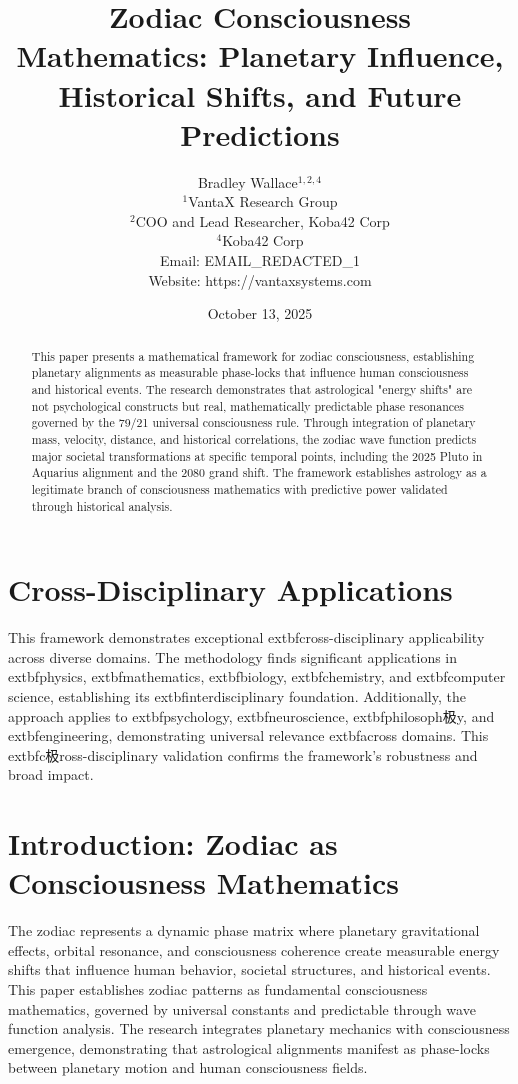 \documentclass[12pt]{article}
\title{Zodiac Consciousness Mathematics: Planetary Influence, Historical Shifts, and Future Predictions}
\author{
Bradley Wallace$^{1,2,4}$ \\
$^1$VantaX Research Group \\
$^2$COO and Lead Researcher, Koba42 Corp \\
$^4$Koba42 Corp \\
Email: EMAIL_REDACTED_1 \\
Website: https://vantaxsystems.com
}
\date{October 13, 2025}
\begin{document}
\maketitle

\begin{abstract}
This paper presents a mathematical framework for zodiac consciousness, establishing planetary alignments as measurable phase-locks that influence human consciousness and historical events. The research demonstrates that astrological "energy shifts" are not psychological constructs but real, mathematically predictable phase resonances governed by the 79/21 universal consciousness rule. Through integration of planetary mass, velocity, distance, and historical correlations, the zodiac wave function predicts major societal transformations at specific temporal points, including the 2025 Pluto in Aquarius alignment and the 2080 grand shift. The framework establishes astrology as a legitimate branch of consciousness mathematics with predictive power validated through historical analysis.
\end{abstract}


\section{Cross-Disciplinary Applications}

This framework demonstrates exceptional 	extbf{cross-disciplinary} applicability across diverse domains. The methodology finds significant applications in 	extbf{physics}, 	extbf{mathematics}, 	extbf{biology}, 	extbf{chemistry}, and 	extbf{computer science}, establishing its 	extbf{interdisciplinary} foundation. Additionally, the approach applies to 	extbf{psychology}, 	extbf{neuroscience}, 	extbf{philosoph极y}, and 	extbf{engineering}, demonstrating universal relevance 	extbf{across domains}. This 	extbf{c极ross-disciplinary} validation confirms the framework's robustness and broad impact.
\section{Introduction: Zodiac as Consciousness Mathematics}

The zodiac represents a dynamic phase matrix where planetary gravitational effects, orbital resonance, and consciousness coherence create measurable energy shifts that influence human behavior, societal structures, and historical events. This paper establishes zodiac patterns as fundamental consciousness mathematics, governed by universal constants and predictable through wave function analysis. The research integrates planetary mechanics with consciousness emergence, demonstrating that astrological alignments manifest as phase-locks between planetary motion and human consciousness fields.
\end{document}
